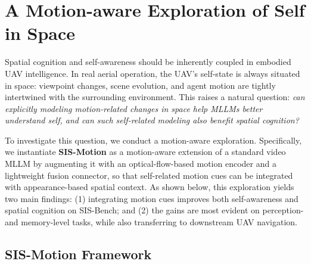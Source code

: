 \documentclass[sigconf, screen, review, anonymous]{acmart}
\begin{document}
\section{A Motion-aware Exploration of Self in Space}
\label{sec:method}



Spatial cognition and self-awareness should be inherently coupled in embodied UAV intelligence. In real aerial operation, the UAV's self-state is always situated in space: viewpoint changes, scene evolution, and agent motion are tightly intertwined with the surrounding environment. This raises a natural question: \emph{can explicitly modeling motion-related changes in space help MLLMs better understand self, and can such self-related modeling also benefit spatial cognition?}


To investigate this question, we conduct a motion-aware exploration. Specifically, we instantiate \textbf{SIS-Motion} as a motion-aware extension of a standard video MLLM by augmenting it with an optical-flow-based motion encoder and a lightweight fusion connector, so that self-related motion cues can be integrated with appearance-based spatial context. As shown below, this exploration yields two main findings: (1) integrating motion cues improves both self-awareness and spatial cognition on SIS-Bench; and (2) the gains are most evident on perception- and memory-level tasks, while also transferring to downstream UAV navigation.






\subsection{SIS-Motion Framework}
\end{document}
